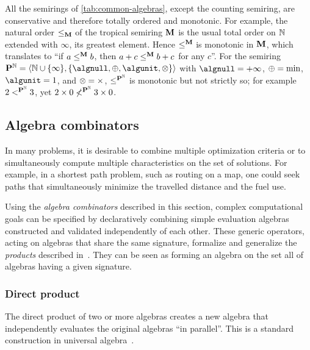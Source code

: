 \begin{example}
    All the semirings of \cref{tab:common-algebras}, except the counting semiring, are conservative and therefore totally ordered and monotonic.
    For example, the natural order \(\le_{\mathbf{M}}\) of the tropical semiring \(\mathbf{M}\) is the usual total order on \(\mathbb{N}\) extended with \(\infty\), its greatest element.
    Hence \(\le^{\mathbf{M}}\) is monotonic in \(\mathbf{M}\), which translates to \enquote{if \(a \le^{\mathbf{M}} b\), then \(a + c \le^{\mathbf{M}} b + c\) for any \(c\)}.
    For the semiring \(\alprod^{\nat} = \tup{\natex, \{\algnull, \algplus, \algunit, \algtimes\}}\)
    with \(\algnull = +\infty\), \(\mathbin{\oplus} = \min\), \(\algunit = 1\), and \(\mathbin{\otimes} = \times\),
    \(\le^{\mathbf{P}^{\mathbb{N}}}\) is monotonic but not strictly so;
    for example \(2 <^{\mathbf{P}^{\mathbb{N}}} 3\), yet \(2 \times 0 \not<^{\mathbf{P}^{\mathbb{N}}} 3 \times 0\).
\end{example}

\subsection{Algebra combinators}\label{sec:adp:alg-combin}

In many problems, it is desirable to combine multiple optimization criteria or to simultaneously compute multiple characteristics on the set of solutions.
For example, in a shortest path problem, such as routing on a map, one could seek paths that simultaneously minimize the travelled distance and the fuel use.

Using the \emph{algebra combinators} described in this section, complex computational goals can be specified by declaratively combining simple evaluation algebras constructed and validated independently of each other.
These generic operators, acting on algebras that share the same signature, formalize and generalize the \emph{products} described in~\parencite{Sauthoff2013BellmansGapLanguage}.
They can be seen as forming an algebra on the set all of algebras having a given signature.


\subsubsection{Direct product}\label{sec:adp:alg-combin:prod}

The direct product of two or more algebras creates a new algebra that independently evaluates the original algebras \enquote{in parallel}.
This is a standard construction in universal algebra~\parencite[ch. II, §7]{Burris2012CourseUniversalAlgebra}.


